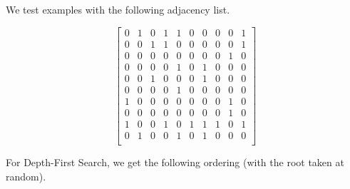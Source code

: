 \documentclass[12pt]{scrartcl}
\begin{document}
We test examples with the following adjacency list.

\[
\begin{bmatrix}
    0 & 1 & 0 & 1 & 1 & 0 & 0 & 0 & 0 & 1 \\
    0 & 0 & 1 & 1 & 0 & 0 & 0 & 0 & 0 & 1 \\
    0 & 0 & 0 & 0 & 0 & 0 & 0 & 0 & 1 & 0 \\
    0 & 0 & 0 & 0 & 1 & 0 & 1 & 0 & 0 & 0 \\
    0 & 0 & 1 & 0 & 0 & 0 & 1 & 0 & 0 & 0 \\
    0 & 0 & 0 & 0 & 1 & 0 & 0 & 0 & 0 & 0 \\
    1 & 0 & 0 & 0 & 0 & 0 & 0 & 0 & 1 & 0 \\
    0 & 0 & 0 & 0 & 0 & 0 & 0 & 0 & 1 & 0 \\
    1 & 0 & 0 & 1 & 0 & 1 & 1 & 1 & 0 & 1 \\
    0 & 1 & 0 & 0 & 1 & 0 & 1 & 0 & 0 & 0 \\
\end{bmatrix}
\]

\subproblem{}
For Depth-First Search, we get the following ordering (with the root taken at random).
\end{document}
